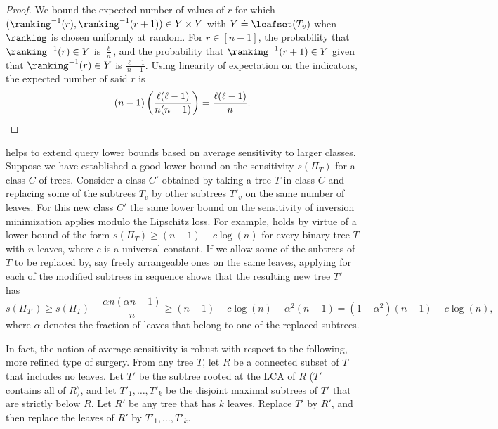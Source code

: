 \begin{proof}
We bound the expected number of values of $r$ for which $(\ranking^{-1}(r),\ranking^{-1}(r+1)) \in Y \times Y$ with $Y \doteq \leafset(T_v)$ when $\ranking$ is chosen uniformly at random. For $r \in [n-1]$, the probability that $\ranking^{-1}(r) \in Y$ is $\frac{\ell}{n}$, and the probability that $\ranking^{-1}(r+1)\in Y$ given that $\ranking^{-1}(r)\in Y$ is $\frac{\ell-1}{n-1}$. Using linearity of expectation on the indicators, the expected number of said $r$ is 
    \begin{equation*}
        (n-1)\left(\frac{\ell(\ell-1)}{n(n-1)}\right) = \frac{\ell(\ell-1)}{n}. \qedhere
    \end{equation*}
\end{proof}

 helps to extend query lower bounds based on average sensitivity to larger classes. Suppose we have established a good lower bound on the sensitivity $s(\Pi_T)$ for a class $C$ of trees. Consider a class $C'$ obtained by taking a tree $T$ in class $C$ and replacing some of the subtrees $T_v$ by other subtrees $T'_v$ on the same number of leaves. For this new class $C'$ the same lower bound on the sensitivity of inversion minimization applies modulo the Lipschitz loss. For example,  holds by virtue of a lower bound of the form $s(\Pi_T) \ge (n-1) - c \log(n)$ for every binary tree $T$ with $n$ leaves, where $c$ is a universal constant. If we allow some of the subtrees of $T$ to be replaced by, say freely arrangeable ones on the same leaves, applying  for each of the modified subtrees in sequence shows that the resulting new tree $T'$ has 
\[ s(\Pi_{T'}) \ge s(\Pi_T) - \frac{\alpha n (\alpha n - 1)}{n} 
\ge (n-1) - c \log(n) - \alpha^2 (n-1) = (1-\alpha^2)(n-1) - c \log(n), \]
where $\alpha$ denotes the fraction of leaves that belong to one of the replaced subtrees.

In fact, the notion of average sensitivity is robust with respect to the following, more refined type of surgery. From any tree $T$, let $R$ be a connected subset of $T$ that includes no leaves. Let $T'$ be the subtree rooted at the LCA of $R$ ($T'$ contains all of $R$), and let $T'_1, \dots, T'_k$ be the disjoint maximal subtrees of $T'$ that are strictly below $R$. Let $R'$ be any tree that has $k$ leaves. Replace $T'$ by $R'$, and then replace the leaves of $R'$ by $T'_1, \dots, T'_k$.

